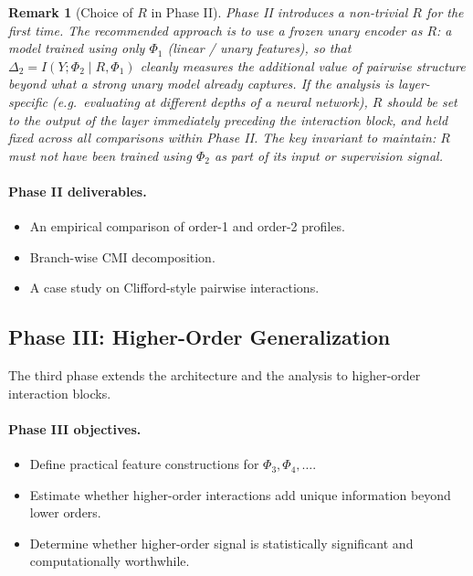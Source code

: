 \documentclass[11pt]{article}
\newtheorem{remark}{Remark}
\newcommand{\1}{\mathbf{1}}
\begin{document}
\begin{remark}[Choice of $R$ in Phase II]
Phase II introduces a non-trivial $R$ for the first time.
The recommended approach is to use a \emph{frozen unary encoder} as $R$: a model trained using
only $\Phi_1$ (linear / unary features), so that $\Delta_2 = I(Y;\Phi_2 \mid R,\Phi_1)$
cleanly measures the additional value of pairwise structure beyond what a strong unary model
already captures.
If the analysis is layer-specific (e.g.\ evaluating at different depths of a neural network),
$R$ should be set to the output of the layer immediately preceding the interaction block, and
held fixed across all comparisons within Phase II.
The key invariant to maintain: $R$ must not have been trained using $\Phi_2$ as part of its input
or supervision signal.
\end{remark}

\paragraph{Phase II deliverables.}
\begin{itemize}[leftmargin=1.5em]
    \item An empirical comparison of order-1 and order-2 profiles.
    \item Branch-wise CMI decomposition.
    \item A case study on Clifford-style pairwise interactions.
\end{itemize}

\subsection{Phase III: Higher-Order Generalization}

The third phase extends the architecture and the analysis to higher-order interaction blocks.

\paragraph{Phase III objectives.}
\begin{itemize}[leftmargin=1.5em]
    \item Define practical feature constructions for $\Phi_3,\Phi_4,\ldots$.
    \item Estimate whether higher-order interactions add unique information beyond lower orders.
    \item Determine whether higher-order signal is statistically significant and computationally
    worthwhile.
\end{itemize}
\end{document}
